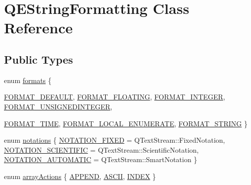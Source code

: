 \hypertarget{classQEStringFormatting}{
\section{QEStringFormatting Class Reference}
\label{classQEStringFormatting}
}
\subsection*{Public Types}
\begin{DoxyCompactItemize}
\item 
enum \hyperlink{classQEStringFormatting_a41b4737442692b41d12b78c036cf9e56}{formats} \{ \par
\hyperlink{classQEStringFormatting_a41b4737442692b41d12b78c036cf9e56a3e86cccea47aecabb3b184cfd1a84c0e}{FORMAT\_\-DEFAULT}, 
\hyperlink{classQEStringFormatting_a41b4737442692b41d12b78c036cf9e56a217a34e72c9797577eb796e5bf39aae9}{FORMAT\_\-FLOATING}, 
\hyperlink{classQEStringFormatting_a41b4737442692b41d12b78c036cf9e56ab21e4911fa6ba48d037943601d13da9a}{FORMAT\_\-INTEGER}, 
\hyperlink{classQEStringFormatting_a41b4737442692b41d12b78c036cf9e56af50713514164a7f6b82874a51fa3eeb1}{FORMAT\_\-UNSIGNEDINTEGER}, 
\par
\hyperlink{classQEStringFormatting_a41b4737442692b41d12b78c036cf9e56a889d3f835617eab667e7812136a0135e}{FORMAT\_\-TIME}, 
\hyperlink{classQEStringFormatting_a41b4737442692b41d12b78c036cf9e56a92e8425fd2781e4021c146594442f620}{FORMAT\_\-LOCAL\_\-ENUMERATE}, 
\hyperlink{classQEStringFormatting_a41b4737442692b41d12b78c036cf9e56a6e589efc86fa0c0acd30322e3e07ee4e}{FORMAT\_\-STRING}
 \}
\item 
enum \hyperlink{classQEStringFormatting_adfa7fa261e196d1327d4da6e046dbd84}{notations} \{ \hyperlink{classQEStringFormatting_adfa7fa261e196d1327d4da6e046dbd84aff4a04845bd3039833cd1cf7f91a8c89}{NOTATION\_\-FIXED} =  QTextStream::FixedNotation, 
\hyperlink{classQEStringFormatting_adfa7fa261e196d1327d4da6e046dbd84a79198d28f4a318e4c9e7334e6beec56b}{NOTATION\_\-SCIENTIFIC} =  QTextStream::ScientificNotation, 
\hyperlink{classQEStringFormatting_adfa7fa261e196d1327d4da6e046dbd84ab8061ebe09c1cacc3f83dc66869c21cd}{NOTATION\_\-AUTOMATIC} =  QTextStream::SmartNotation
 \}
\item 
enum \hyperlink{classQEStringFormatting_a36b424886bc64cea8f7ed69b2b03c0b9}{arrayActions} \{ \hyperlink{classQEStringFormatting_a36b424886bc64cea8f7ed69b2b03c0b9a17613cfb7e87103922490471cd6bde06}{APPEND}, 
\hyperlink{classQEStringFormatting_a36b424886bc64cea8f7ed69b2b03c0b9ae8a32203c042705835af1cd34c85c0d2}{ASCII}, 
\hyperlink{classQEStringFormatting_a36b424886bc64cea8f7ed69b2b03c0b9a83330940881ccb325ea24056232b6e68}{INDEX}
 \}
\end{DoxyCompactItemize}
